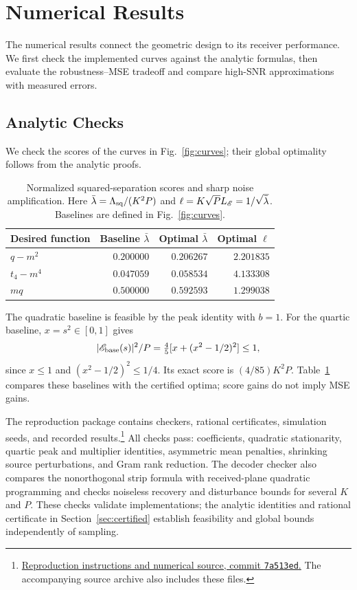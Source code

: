 \section{Numerical Results}\label{sec:evidence}
The numerical results connect the geometric design to its receiver performance. We first check the implemented curves against the analytic formulas, then evaluate the robustness--MSE tradeoff and compare high-SNR approximations with measured errors.

\subsection{Analytic Checks}
We check the scores of the curves in Fig.~\ref{fig:curves}; their global optimality follows from the analytic proofs.

\begin{table}[t]\caption{Normalized squared-separation scores and sharp noise amplification. Here $\bar\lambda=\Lambda_{\mathrm{sq}}/(K^2P)$ and $\ell=K\sqrt P L_\mathscr E=1/\sqrt{\bar\lambda}$. Baselines are defined in Fig.~\ref{fig:curves}.}\label{tab:values}
\centering\small\begin{tabular}{@{}lrrr@{}}\toprule
Desired function & Baseline $\bar\lambda$ & Optimal $\bar\lambda$ & Optimal $\ell$\\\midrule
$q-m^2$ & $0.200000$ & $0.206267$ & $2.201835$\\
$t_4-m^4$ & $0.047059$ & $0.058534$ & $4.133308$\\
$mq$ & $0.500000$ & $0.592593$ & $1.299038$\\\bottomrule
\end{tabular}\end{table}


The quadratic baseline is feasible by the peak identity with $b=1$. For the quartic baseline, $x=s^2\in[0,1]$ gives
$$|\mathscr E_{\rm base}(s)|^2/P=\tfrac45[x+(x^2-1/2)^2]\le1,$$
since $x\le1$ and $(x^2-1/2)^2\le1/4$. Its exact score is $(4/85)K^2P$. Table~\ref{tab:values} compares these baselines with the certified optima; score gains do not imply MSE gains.

The reproduction package contains checkers, rational certificates, simulation seeds, and recorded results.\footnote{\href{https://github.com/SaeedRazavikia/Optimal-Continuous-Analog-Encoders-TIT-/blob/7a513ed38147a73f109f9b184dafba59c17ee89b/REPRODUCIBILITY.md}{Reproduction instructions and numerical source, commit \texttt{7a513ed}.} The accompanying source archive also includes these files.} All checks pass: coefficients, quadratic stationarity, quartic peak and multiplier identities, asymmetric mean penalties, shrinking source perturbations, and Gram rank reduction. The decoder checker also compares the nonorthogonal strip formula with received-plane quadratic programming and checks noiseless recovery and disturbance bounds for several $K$ and $P$. These checks validate implementations; the analytic identities and rational certificate in Section~\ref{sec:certified} establish feasibility and global bounds independently of sampling.



\FloatBarrier

\FloatBarrier

